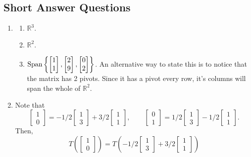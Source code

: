 \subsection*{Short Answer Questions}
\begin{enumerate}
	\item \begin{enumerate}
			\item \(\mathbb{R}^3\).
			\item \(\mathbb{R}^2\).
			\item \(\operatorname{Span}\left\{\begin{bmatrix}1 \\ 1\end{bmatrix}, \begin{bmatrix}2 \\ 9\end{bmatrix}, \begin{bmatrix}0 \\ 2\end{bmatrix}\right\}\). An
				alternative way to state this is to notice that the matrix has 2 pivots. Since it has a pivot every row, it's columns will span the whole of 
				\(\mathbb{R}^2\).
		\end{enumerate}
	\item Note that 
		\[\begin{bmatrix}1 \\ 0\end{bmatrix} = -1/2\begin{bmatrix}1 \\ 3\end{bmatrix} + 3/2\begin{bmatrix}1 \\ 1\end{bmatrix}, \qquad
		  \begin{bmatrix}0 \\ 1\end{bmatrix} = 1/2\begin{bmatrix}1 \\ 3\end{bmatrix} - 1/2\begin{bmatrix}1 \\ 1\end{bmatrix}.
		\] Then, 
		\[T\left(\begin{bmatrix}1 \\ 0\end{bmatrix}\right) 
		  = T\left(-1/2\begin{bmatrix}1 \\ 3\end{bmatrix} + 3/2\begin{bmatrix}1 \\ 1 \end{bmatrix}\right)
\]
\end{enumerate}
